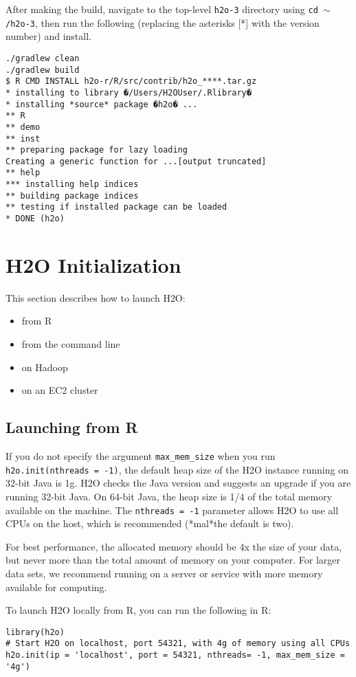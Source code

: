After making the build, navigate to the top-level \texttt{h2o-3} directory using {\texttt{cd $\mathtt{\sim}$/h2o-3}}, then run the following (replacing the asterisks [*] with the version number) and install.
\begin{lstlisting}[style=R]
./gradlew clean 
./gradlew build
$ R CMD INSTALL h2o-r/R/src/contrib/h2o_****.tar.gz
* installing to library �/Users/H2OUser/.Rlibrary�
* installing *source* package �h2o� ...
** R
** demo
** inst
** preparing package for lazy loading
Creating a generic function for ...[output truncated]
** help
*** installing help indices
** building package indices
** testing if installed package can be loaded
* DONE (h2o)
\end{lstlisting}

\section{H2O Initialization}

This section describes how to launch H2O: 
\begin{itemize}
\item from R
\item from the command line
\item on Hadoop
\item on an EC2 cluster
\end{itemize}

\subsection{Launching from R} \label{ssec:LaunchR}

If you do not specify the argument {\texttt{max\_mem\_size}} when you run {\texttt{h2o.init(nthreads = -1)}}, the default heap size of the H2O instance running on 32-bit Java is 1g. H2O checks the Java version and suggests an upgrade if you are running 32-bit Java. On 64-bit Java, the heap size is 1/4 of the total memory available on the machine. The {\texttt{nthreads = -1}} parameter allows H2O to use all CPUs on the host, which is recommended (*mal*the default is two).


For best performance, the allocated memory should be 4x the size of your data, but never more than the total amount of memory on your computer. For larger data sets, we recommend running on a server or service with more memory available for computing.


To launch H2O locally from R, you can run the following in R:
\begin{lstlisting}[style=R]
library(h2o)
# Start H2O on localhost, port 54321, with 4g of memory using all CPUs
h2o.init(ip = 'localhost', port = 54321, nthreads= -1, max_mem_size = '4g')
\end{lstlisting}

